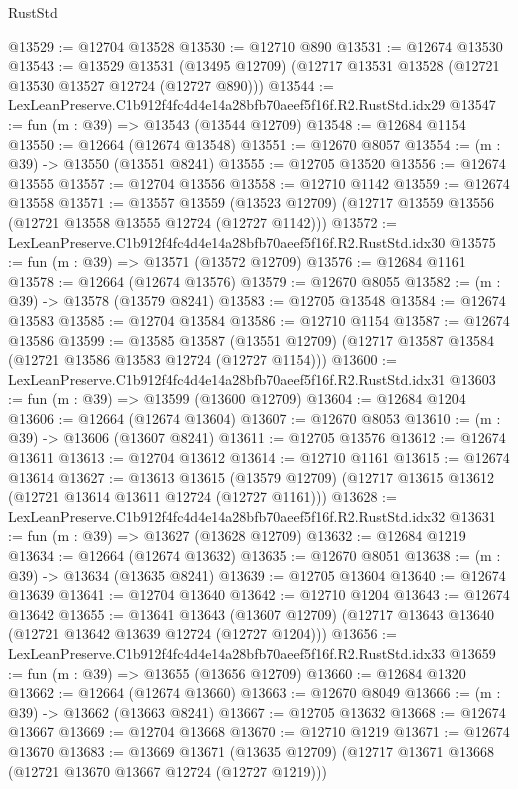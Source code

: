 \begin{lexlean}{RustStd}
\begin{coremodule}
@13529 := @12704 @13528
@13530 := @12710 @890
@13531 := @12674 @13530
@13543 := @13529
    @13531
    (@13495 @12709)
    (@12717 @13531 @13528 (@12721 @13530 @13527 @12724 (@12727 @890)))
@13544 := LexLeanPreserve.C1b912f4fc4d4e14a28bfb70aeef5f16f.R2.RustStd.idx29
@13547 := fun (m : @39) => @13543 (@13544 @12709)
@13548 := @12684 @1154
@13550 := @12664 (@12674 @13548)
@13551 := @12670 @8057
@13554 := (m : @39) -> @13550 (@13551 @8241)
@13555 := @12705 @13520
@13556 := @12674 @13555
@13557 := @12704 @13556
@13558 := @12710 @1142
@13559 := @12674 @13558
@13571 := @13557
    @13559
    (@13523 @12709)
    (@12717 @13559 @13556 (@12721 @13558 @13555 @12724 (@12727 @1142)))
@13572 := LexLeanPreserve.C1b912f4fc4d4e14a28bfb70aeef5f16f.R2.RustStd.idx30
@13575 := fun (m : @39) => @13571 (@13572 @12709)
@13576 := @12684 @1161
@13578 := @12664 (@12674 @13576)
@13579 := @12670 @8055
@13582 := (m : @39) -> @13578 (@13579 @8241)
@13583 := @12705 @13548
@13584 := @12674 @13583
@13585 := @12704 @13584
@13586 := @12710 @1154
@13587 := @12674 @13586
@13599 := @13585
    @13587
    (@13551 @12709)
    (@12717 @13587 @13584 (@12721 @13586 @13583 @12724 (@12727 @1154)))
@13600 := LexLeanPreserve.C1b912f4fc4d4e14a28bfb70aeef5f16f.R2.RustStd.idx31
@13603 := fun (m : @39) => @13599 (@13600 @12709)
@13604 := @12684 @1204
@13606 := @12664 (@12674 @13604)
@13607 := @12670 @8053
@13610 := (m : @39) -> @13606 (@13607 @8241)
@13611 := @12705 @13576
@13612 := @12674 @13611
@13613 := @12704 @13612
@13614 := @12710 @1161
@13615 := @12674 @13614
@13627 := @13613
    @13615
    (@13579 @12709)
    (@12717 @13615 @13612 (@12721 @13614 @13611 @12724 (@12727 @1161)))
@13628 := LexLeanPreserve.C1b912f4fc4d4e14a28bfb70aeef5f16f.R2.RustStd.idx32
@13631 := fun (m : @39) => @13627 (@13628 @12709)
@13632 := @12684 @1219
@13634 := @12664 (@12674 @13632)
@13635 := @12670 @8051
@13638 := (m : @39) -> @13634 (@13635 @8241)
@13639 := @12705 @13604
@13640 := @12674 @13639
@13641 := @12704 @13640
@13642 := @12710 @1204
@13643 := @12674 @13642
@13655 := @13641
    @13643
    (@13607 @12709)
    (@12717 @13643 @13640 (@12721 @13642 @13639 @12724 (@12727 @1204)))
@13656 := LexLeanPreserve.C1b912f4fc4d4e14a28bfb70aeef5f16f.R2.RustStd.idx33
@13659 := fun (m : @39) => @13655 (@13656 @12709)
@13660 := @12684 @1320
@13662 := @12664 (@12674 @13660)
@13663 := @12670 @8049
@13666 := (m : @39) -> @13662 (@13663 @8241)
@13667 := @12705 @13632
@13668 := @12674 @13667
@13669 := @12704 @13668
@13670 := @12710 @1219
@13671 := @12674 @13670
@13683 := @13669
    @13671
    (@13635 @12709)
    (@12717 @13671 @13668 (@12721 @13670 @13667 @12724 (@12727 @1219)))

\end{coremodule}
\end{lexlean}
